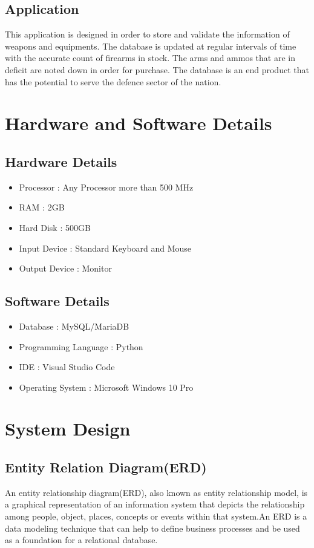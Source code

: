 \documentclass[12pt,a4paper]{report}
\begin{document}
\section{Application}
This application is designed in order to store and validate the information of weapons and equipments. The database is updated at regular intervals of time with the accurate count of firearms in stock. The arms and ammos that are in deficit are noted down in order for purchase. The database is an end product that has the potential to serve the defence sector of
the nation.


\chapter{Hardware and Software Details}
\section{Hardware Details}
\begin{itemize}
\item Processor : Any Processor more than 500 MHz
\item RAM : 2GB
\item Hard Disk : 500GB
\item Input Device : Standard Keyboard and Mouse
\item Output Device : Monitor
\end{itemize}
\section{Software Details}
\begin{itemize}
\item Database : MySQL/MariaDB
\item Programming Language : Python
\item IDE : Visual Studio Code
\item Operating System : Microsoft Windows 10 Pro
\end{itemize}

\chapter{System Design}
\section{Entity Relation Diagram(ERD)}

\par
An entity relationship diagram(ERD), also known as entity relationship model, is a graphical representation of an information system that depicts the relationship among people, object, places, concepts or events within that system.An ERD is a data modeling technique that can help to define business processes and be used as a foundation for a relational database.
\end{document}
